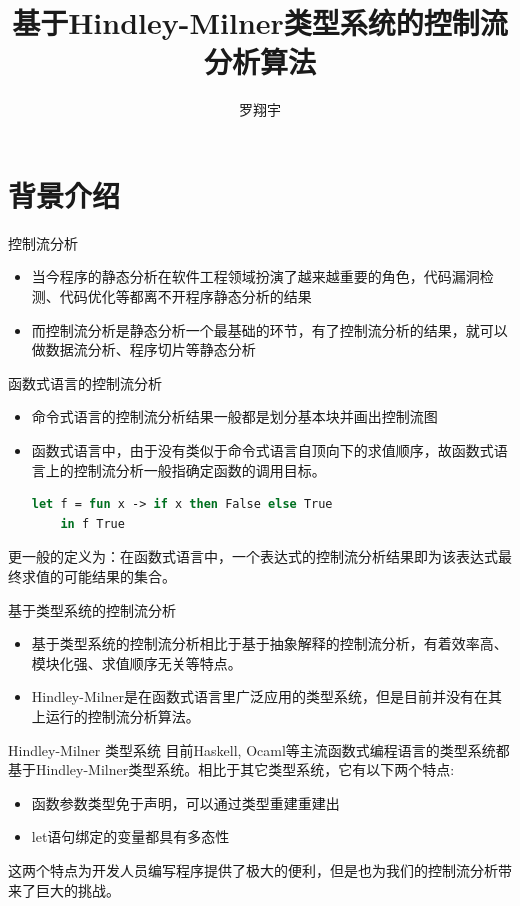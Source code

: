 \documentclass[9pt]{beamer}
\title{基于Hindley-Milner类型系统的控制流分析算法}
\author[Xiangyu Luo]{罗翔宇}
\institute[sist]{北京大学\\信息科学技术学院}
\begin{document}
    \begin{frame}
        \titlepage
    \end{frame}
    
    \section{背景介绍}
    \begin{frame}{控制流分析}
        \begin{itemize}
        		\item 当今程序的静态分析在软件工程领域扮演了越来越重要的角色，代码漏洞检测、代码优化等都离不开程序静态分析的结果
		\vspace{0.8em}
		\item 而控制流分析是静态分析一个最基础的环节，有了控制流分析的结果，就可以做数据流分析、程序切片等静态分析
        \end{itemize}
    \end{frame}
    
\begin{frame}[fragile]{函数式语言的控制流分析}
    	\begin{itemize}
		\item 命令式语言的控制流分析结果一般都是划分基本块并画出控制流图
				\vspace{0.8em}
		\item 函数式语言中，由于没有类似于命令式语言自顶向下的求值顺序，故函数式语言上的控制流分析一般指确定函数的调用目标。
        \begin{lstlisting}[language=Ocaml]
	let f = fun x -> if x then False else True
	in f True
        \end{lstlisting}
        \end{itemize}
        更一般的定义为：在函数式语言中，一个表达式的控制流分析结果即为该表达式最终求值的可能结果的集合。
\end{frame}
    
\begin{frame}{基于类型系统的控制流分析}
	\begin{itemize}
		\item 基于类型系统的控制流分析相比于基于抽象解释的控制流分析，有着效率高、模块化强、求值顺序无关等特点。
		\vspace{0.8em}
		\item Hindley-Milner是在函数式语言里广泛应用的类型系统，但是目前并没有在其上运行的控制流分析算法。
	\end{itemize}
\end{frame}

\begin{frame}{Hindley-Milner 类型系统}
	目前Haskell, Ocaml等主流函数式编程语言的类型系统都基于Hindley-Milner类型系统。相比于其它类型系统，它有以下两个特点:
	\vspace{1.5em}
	\begin{itemize}
		\item 函数参数类型免于声明，可以通过类型重建重建出
		\item let语句绑定的变量都具有多态性
	\end{itemize}
	\vspace{1.5em}
	这两个特点为开发人员编写程序提供了极大的便利，但是也为我们的控制流分析带来了巨大的挑战。
\end{frame}
\end{document}
